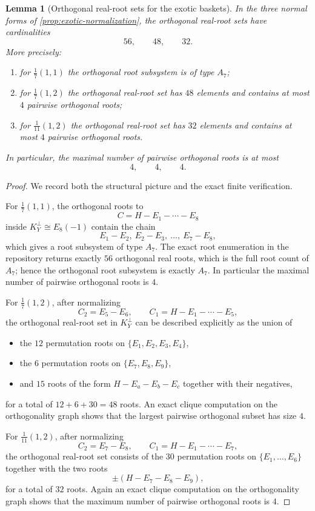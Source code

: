 \documentclass[11pt]{article}
\newtheorem{lemma}[lemma]{Lemma}
\theoremstyle{definition}
\begin{document}
\begin{lemma}[Orthogonal real-root sets for the exotic baskets]\label{lem:exotic-root-types}
In the three normal forms of \cref{prop:exotic-normalization}, the orthogonal real-root sets have cardinalities
\[
56,\qquad 48,\qquad 32.
\]
More precisely:
\begin{enumerate}[label=\textup{(\roman*)},leftmargin=2.5em]
    \item for $\frac17(1,1)$ the orthogonal root subsystem is of type $A_7$;
    \item for $\frac17(1,2)$ the orthogonal real-root set has $48$ elements and contains at most $4$ pairwise orthogonal roots;
    \item for $\frac1{11}(1,2)$ the orthogonal real-root set has $32$ elements and contains at most $4$ pairwise orthogonal roots.
\end{enumerate}
In particular, the maximal number of pairwise orthogonal roots is at most
\[
4,\qquad 4,\qquad 4.
\]
\end{lemma}

\begin{proof}
We record both the structural picture and the exact finite verification.

For $\frac17(1,1)$, the orthogonal roots to
\[
C=H-E_1-\cdots-E_8
\]
inside $K_Y^{\perp}\cong E_8(-1)$ contain the chain
\[
E_1-E_2,\ E_2-E_3,\ \dots,\ E_7-E_8,
\]
which gives a root subsystem of type $A_7$. The exact root enumeration in the repository returns exactly $56$ orthogonal real roots, which is the full root count of $A_7$; hence the orthogonal root subsystem is exactly $A_7$. In particular the maximal number of pairwise orthogonal roots is $4$.

For $\frac17(1,2)$, after normalizing
\[
C_2=E_5-E_6,\qquad C_1=H-E_1-\cdots-E_5,
\]
the orthogonal real-root set in $K_Y^{\perp}$ can be described explicitly as the union of
\begin{itemize}[leftmargin=2.5em]
    \item the $12$ permutation roots on $\{E_1,E_2,E_3,E_4\}$,
    \item the $6$ permutation roots on $\{E_7,E_8,E_9\}$,
    \item and $15$ roots of the form $H-E_a-E_b-E_c$ together with their negatives,
\end{itemize}
for a total of $12+6+30=48$ roots. An exact clique computation on the orthogonality graph shows that the largest pairwise orthogonal subset has size $4$.

For $\frac1{11}(1,2)$, after normalizing
\[
C_2=E_7-E_8,\qquad C_1=H-E_1-\cdots-E_7,
\]
the orthogonal real-root set consists of the $30$ permutation roots on $\{E_1,\dots,E_6\}$ together with the two roots
\[
\pm(H-E_7-E_8-E_9),
\]
for a total of $32$ roots. Again an exact clique computation on the orthogonality graph shows that the maximum number of pairwise orthogonal roots is $4$.
\end{proof}
\end{document}
